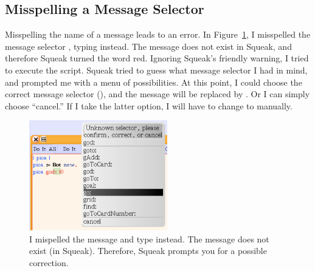 \documentclass[a4paper,10pt,twoside]{book}
\begin{document}
\subsection{Misspelling a Message Selector}

Misspelling the name of a message leads to an error. In Figure~\ref{fig:unknowSelector}, I misspelled the message 
selector , typing  instead. The message  does not exist in Squeak, and therefore 
Squeak turned the word red. Ignoring Squeak’s friendly warning, I tried to execute the script. 
Squeak tried to guess what message selector I had in mind, and prompted me with a menu of 
possibilities. At this point, I could choose the correct message selector (), and the message 
 will be replaced by . Or I can simply choose “cancel.” If I take the latter option, I will 
have to change  to  manually. 

\begin{figure}[ht!]
\begin{center}\includegraphics[width=6cm]{6-errorOne}
\caption{I mispelled the message  and type  instead. The message  does not exist (in Squeak). Therefore, Squeak prompts you for a possible correction. \label{fig:unknowSelector}}\end{center}
\end{figure}
\end{document}
